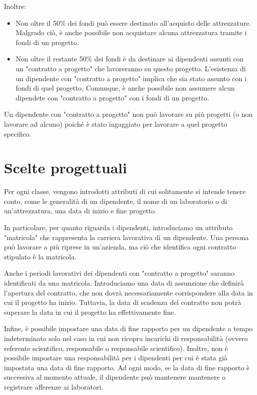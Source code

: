         Inoltre:
        \begin{itemize}
            \item Non oltre il 50\% dei fondi può essere destinato all'acquisto delle attrezzature. Malgrado ciò, è anche possibile non acquistare alcuna attrezzatura tramite i fondi di un progetto.
            \item Non oltre il restante 50\% dei fondi è da destinare ai dipendenti assunti con un "contratto a progetto" che lavoreranno su questo progetto. L'esistenza di un dipendente con "contratto a progetto" implica che sia stato assunto con i fondi di quel progetto. Comunque, è anche possibile non assumere alcun dipendete con "contratto a progetto" con i fondi di un progetto.
        \end{itemize}
        Un dipendente con "contratto a progetto" non può lavorare su più progetti (o non lavorare ad alcuno) poiché è stato ingaggiato per lavorare a quel progetto specifico.


    \section{Scelte progettuali}
        Per ogni classe, vengono introdotti attributi di cui solitamente si intende tenere conto, come le generalità di un dipendente, il nome di un laboratorio o di un'attrezzatura, una data di inizio e fine progetto.
        
        In particolare, per quanto riguarda i dipendenti, introduciamo un attributo "matricola" che rappresenta la carriera lavorativa di un dipendente. Una persona può lavorare a più riprese in un'azienda, ma ciò che identifica ogni contratto stipulato è la matricola.
        
        Anche i periodi lavorativi dei dipendenti con "contratto a progetto" saranno identificati da una matricola. Introduciamo una data di assunzione che definirà l'apertura del contratto, che non dovrà necessariamente corrispondere alla data in cui il progetto ha inizio. Tuttavia, la data di scadenza del contratto non potrà superare la data in cui il progetto ha effettivamente fine.

        Infine, è possibile impostare una data di fine rapporto per un dipendente a tempo indeterminato solo nel caso in cui non ricopra incarichi di responsabilità (ovvero referente scientifico, responsabile o responsabile scientifico). Inoltre, non è possibile impostare una responsabilità per i dipendenti per cui è stata già impostata una data di fine rapporto. Ad ogni modo, se la data di fine rapporto è successiva al momento attuale, il dipendente può mantenere mantenere o registrare afferenze ai laboratori.

